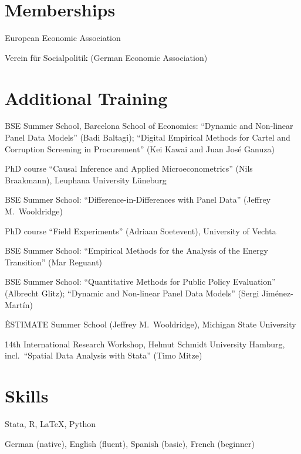 \documentclass[11pt,a4paper]{article}
\newcommand{\entry}[2]{\item[#1]#2}
\begin{document}
\section{Memberships}
\begin{entries}
  \entry{2024--present}{European Economic Association}
  \entry{2021--present}{Verein für Socialpolitik (German Economic Association)}
\end{entries}

\section{Additional Training}
\begin{entries}
  \entry{2025}{BSE Summer School, Barcelona School of Economics: ``Dynamic and Non-linear Panel
    Data Models'' (Badi Baltagi); ``Digital Empirical Methods for Cartel and Corruption Screening
    in Procurement'' (Kei Kawai and Juan José Ganuza)}
  \entry{2025}{PhD course ``Causal Inference and Applied Microeconometrics'' (Nils Braakmann),
    Leuphana University Lüneburg}
  \entry{2024}{BSE Summer School: ``Difference-in-Differences with Panel Data'' (Jeffrey M.\ Wooldridge)}
  \entry{2024}{PhD course ``Field Experiments'' (Adriaan Soetevent), University of Vechta}
  \entry{2023}{BSE Summer School: ``Empirical Methods for the Analysis of the Energy Transition''
    (Mar Reguant)}
  \entry{2022}{BSE Summer School: ``Quantitative Methods for Public Policy Evaluation'' (Albrecht
    Glitz); ``Dynamic and Non-linear Panel Data Models'' (Sergi Jiménez-Martín)}
  \entry{2021}{ÊSTIMATE Summer School (Jeffrey M.\ Wooldridge), Michigan State University}
  \entry{2020}{14th International Research Workshop, Helmut Schmidt University Hamburg, incl.\
    ``Spatial Data Analysis with Stata'' (Timo Mitze)}
\end{entries}

\section{Skills}
\begin{entries}
  \entry{Software}{Stata, R, LaTeX, Python}
  \entry{Languages}{German (native), English (fluent), Spanish (basic), French (beginner)}
\end{entries}
\end{document}
